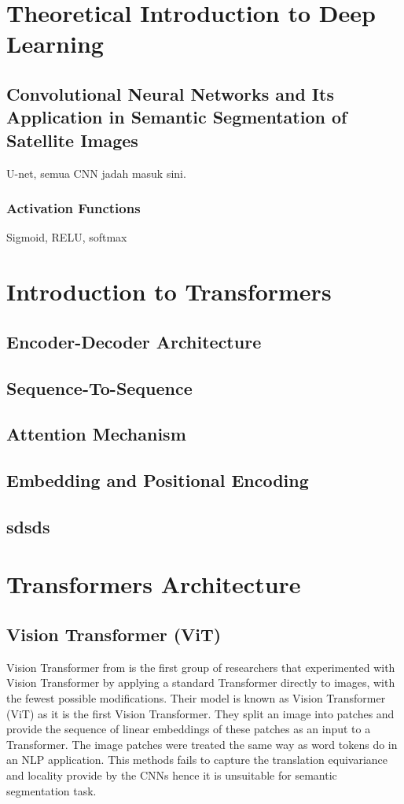 \section{Theoretical Introduction to Deep Learning}
\subsection{Convolutional Neural Networks and Its Application in Semantic Segmentation of Satellite Images}

U-net, semua CNN jadah masuk sini.
\subsubsection{Activation Functions}
Sigmoid, RELU, softmax

\section{Introduction to Transformers}\label{subsection:Intro to Trans}
\subsection{Encoder-Decoder Architecture}
\subsection{Sequence-To-Sequence}
\subsection{Attention Mechanism}
\subsection{Embedding and Positional Encoding}
\subsection{sdsds}\label{sasas}
\section{Transformers Architecture}
\subsection{Vision Transformer (ViT)}
Vision Transformer from \cite{16x16} is the first group of researchers that experimented with Vision Transformer by applying a standard Transformer directly to images, with the fewest possible modifications. Their model is known as Vision Transformer (ViT) as it is the first Vision Transformer. They split an image into patches and provide the sequence of linear embeddings of these patches as an input to a Transformer. The image patches were treated the same way as word tokens do in an NLP application. This methods fails to capture the  translation equivariance and locality provide by the CNNs hence it is unsuitable for semantic segmentation task.

